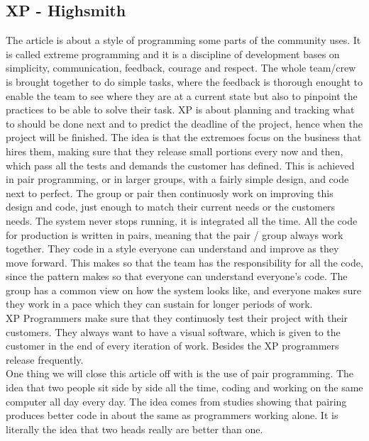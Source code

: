 \documentclass[a4paper]{article}
\begin{document}
\subsection{XP - Highsmith}
The article is about a style of programming some parts of the community uses. It is called extreme programming and it is a discipline of development bases on simplicity, communication, feedback, courage and respect. The whole team/crew is brought together to do simple tasks, where the feedback is thorough enought to enable the team to see where they are at a current state but also to pinpoint the practices to be able to solve their task. XP is about planning and tracking what to should be done next and to predict the deadline of the project, hence when the project will be finished. The idea is that the extremoes focus on the business that hires them, making sure that they release small portions every now and then, which pass all the tests and demands the customer has defined. This is achieved in pair programming, or in larger groups, with a fairly simple design, and code next to perfect. The group or pair then continuosly work on improving this design and code, just enough to match their current needs or the customers needs. The system never stops running, it is integrated all the time. All the code for production is written in pairs, meaning that the pair / group always work together. They code in a style everyone can understand and improve as they move forward. This makes so that the team has the responsibility for all the code, since the pattern makes so that everyone can understand everyone's code. The group has a common view on how the system looks like, and everyone makes sure they work in a pace which they can sustain for longer periods of work. \\
XP Programmers make sure that they continuosly test their project with their customers. They always want to have a visual software, which is given to the customer in the end of every iteration of work. Besides the XP programmers release frequently. \\
One thing we will close this article off with is the use of pair programming. The idea that two people sit side by side all the time, coding and working on the same computer all day every day. The idea comes from studies showing that pairing produces better code in about the same as programmers working alone. It is literally the idea that two heads really are better than one.\\
\\
\end{document}
